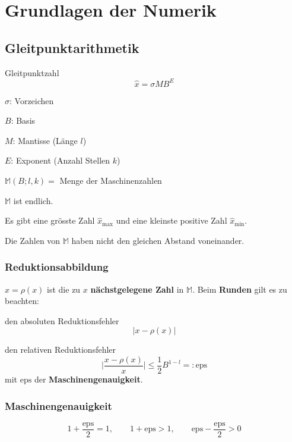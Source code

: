 
\section{Grundlagen der Numerik} 
	\subsection{Gleitpunktarithmetik} Gleitpunktzahl
		\[
			\hat x = \sigma M B^E
		\]
		\begin{tightitemize}
			\item[$\sigma$:] Vorzeichen
			\item[$B$:] Basis
			\item[$M$:] Mantisse (Länge $l$)
			\item[$E$:] Exponent (Anzahl Stellen $k$)
		\end{tightitemize}

		$\mathbb{M} (B; l, k) = $ Menge der Maschinenzahlen
		\begin{tightitemize}
			\item $\mathbb{M}$ ist endlich. 
			\item Es gibt eine grösste Zahl $\hat x_{\text{max}}$ und eine kleinste positive Zahl $\hat x_\text{min}$. 
			\item Die Zahlen von $\mathbb{M}$ haben nicht den gleichen Abstand voneinander. 
		\end{tightitemize}
		
		\subsubsection{Reduktionsabbildung}
			$\hat x = \rho(x)$ ist die zu $x$ \textbf{nächstgelegene Zahl} in $\mathbb{M}$. Beim \textbf{Runden} gilt es zu beachten: 
			\begin{tightenumerate}
				\item den absoluten Reduktionsfehler
				\[ |x-\rho(x)|\]
				\item den relativen Reduktionsfehler
				\[ \Big\vert \frac{x-\rho(x)}{x}\Big\vert \leq \frac{1}{2}B^{1-l} =: \mathrm{eps}\]
				mit $\mathrm{eps}$ der \textbf{Maschinengenauigkeit}. 
			\end{tightenumerate}
			
		\subsubsection{Maschinengenauigkeit}
			\[
				1 + \frac{\mathrm{eps}}{2} = 1, \qquad 1 + \mathrm{eps} > 1, \qquad \mathrm{eps} - \frac{\mathrm{eps}}{2} > 0
			\]
			
